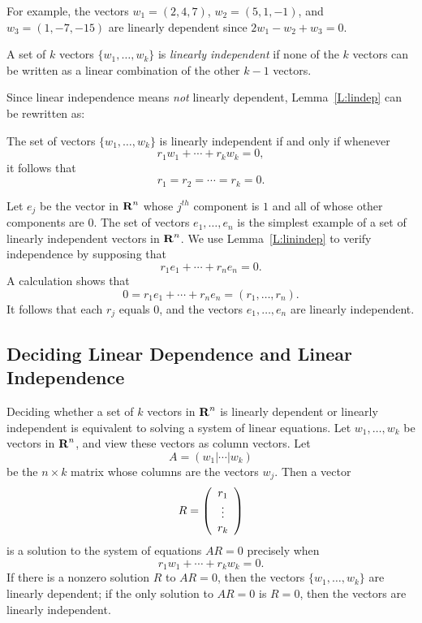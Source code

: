 For example, the vectors $w_1=(2,4,7)$, $w_2=(5,1,-1)$, and
$w_3=(1,-7,-15)$ are linearly dependent since $2w_1-w_2+w_3=0$.

\begin{Def}  \label{linearindependence}
A set of $k$ vectors $\{w_1,\ldots,w_k\}$ is {\em linearly
independent\/} if none of the $k$ vectors can be written as a
linear combination of the other $k-1$ vectors.
\end{Def} 

Since linear independence means {\em not\/} linearly dependent,
Lemma~\ref{L:lindep} can be rewritten as:
\begin{lemma}  \label{L:linindep}
The set of vectors $\{w_1,\ldots,w_k\}$ is linearly independent if and
only if whenever
\[
r_1w_1 + \cdots + r_kw_k = 0,
\]
it follows that
\[
r_1 = r_2 = \cdots = r_k = 0.
\]
\end{lemma}

Let $e_j$ be the vector in $\mbox{$\bf{R}$}^n$ whose $j^{th}$ component is $1$
and all of whose other components are $0$. The set of vectors
$e_1,\ldots,e_n$ is the simplest example of a set of linearly
independent vectors in $\mbox{$\bf{R}$}^n$.  We use Lemma~\ref{L:linindep} to
verify independence by supposing that
\[
r_1e_1 + \cdots + r_ne_n = 0.
\]
A calculation shows that
\[
0 = r_1e_1 + \cdots + r_ne_n = (r_1,\ldots,r_n).
\]
It follows that each $r_j$ equals $0$, and the vectors
$e_1,\ldots,e_n$ are linearly independent.


\subsection*{Deciding Linear Dependence and Linear Independence}

Deciding whether a set of $k$ vectors in $\mbox{$\bf{R}$}^n$ is linearly
dependent or linearly independent is equivalent to solving a
system of linear equations.  Let $w_1,\ldots,w_k$ be vectors
in $\mbox{$\bf{R}$}^n$, and view these vectors as column vectors. Let
\begin{equation}  \label{E:Ank}
A=(w_1|\cdots|w_k)
\end{equation}
be the $n\times k$ matrix whose columns are the vectors $w_j$.
Then a vector
\[
R = \left(\begin{array}{c} r_1 \\ \vdots \\ r_{k}\end{array}\right)
\]
is a solution to the system of equations $AR=0$ precisely when
\begin{equation}
r_1w_1 + \cdots + r_kw_k = 0.
\end{equation}
If there is a nonzero solution $R$ to $AR=0$, then the vectors
$\{w_1,\ldots,w_k\}$ are linearly dependent; if the only solution
to $AR=0$ is $R=0$, then the vectors are linearly independent.

